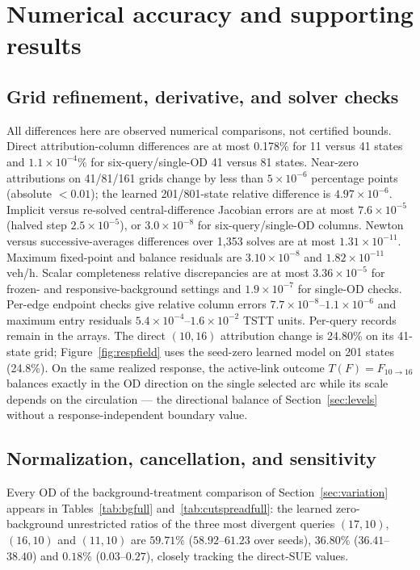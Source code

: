 \section{Numerical accuracy and supporting results}\label{supp:numdetail}\label{supp:transrecords}
\subsection{Grid refinement, derivative, and solver checks}\label{supp:accuracy}
All differences here are observed numerical comparisons, not certified
bounds. Direct attribution-column differences are at most 0.178\% for
11 versus 41 states and $1.1\times10^{-4}\%$ for six-query/single-OD
41 versus 81 states. Near-zero attributions on 41/81/161 grids change by
less than $5\times10^{-6}$ percentage points (absolute $<0.01$); the
learned 201/801-state relative difference is $4.97\times10^{-6}$.
Implicit versus re-solved central-difference Jacobian errors are at most
$7.6\times10^{-5}$ (halved step $2.5\times10^{-5}$), or
$3.0\times10^{-8}$ for six-query/single-OD columns. Newton versus
successive-averages differences over 1,353 solves are at most
$1.31\times10^{-11}$. Maximum fixed-point and balance residuals are
$3.10\times10^{-8}$ and $1.82\times10^{-11}$ veh/h. Scalar completeness
relative discrepancies are at most $3.36\times10^{-5}$ for
frozen- and responsive-background settings and $1.9\times10^{-7}$ for single-OD checks.
Per-edge endpoint checks give relative column errors
$7.7\times10^{-8}$--$1.1\times10^{-6}$ and maximum entry residuals
$5.4\times10^{-4}$--$1.6\times10^{-2}$ TSTT units. Per-query records
remain in the arrays. The direct $(10,16)$ attribution change is 24.80\%
on its 41-state grid; Figure~\ref{fig:respfield} uses the seed-zero
learned model on 201 states (24.8\%). On the same realized response,
the active-link outcome $T(F)=F_{10\to16}$ balances exactly in the OD
direction on the single selected arc while its scale depends on the
circulation --- the directional balance of
Section~\ref{sec:levels} without a response-independent boundary value.

\subsection{Normalization, cancellation, and sensitivity}\label{supp:additional}
Every OD of the background-treatment comparison of
Section~\ref{sec:variation} appears in
Tables~\ref{tab:bgfull} and~\ref{tab:cutspreadfull}: the learned
zero-background unrestricted ratios of the three most divergent queries
$(17,10)$, $(16,10)$ and $(11,10)$ are $59.71\%$ ($58.92$--$61.23$ over
seeds), $36.80\%$ ($36.41$--$38.40$) and $0.18\%$ ($0.03$--$0.27$),
closely tracking the direct-SUE values.

